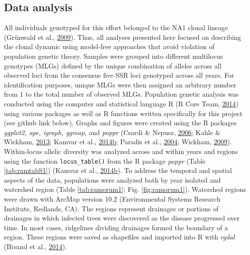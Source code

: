 \documentclass[double,11pt]{beavtex}
\begin{document}
  \subsection{Data analysis}\label{data-analysis-1}
  
  All individuals genotyped for this effort belonged to the NA1 clonal
  lineage (Grünwald et al.,
  \protect\hyperlink{ref-grunwald2009standardizing}{2009}). Thus, all
  analyses presented here focused on describing the clonal dynamic using
  model-free approaches that avoid violation of population genetic theory.
  Samples were grouped into different multilocus genotypes (MLGs) defined
  by the unique combination of alleles across all observed loci from the
  consensus five SSR loci genotyped across all years. For identification
  purposes, unique MLGs were then assigned an arbitrary number from 1 to
  the total number of observed MLGs. Population genetic analysis was
  conducted using the computer and statistical language R (R Core Team,
  \protect\hyperlink{ref-R2014}{2014}) using various packages as well as R
  functions written specifically for this project (see github link below).
  Graphs and figures were created using the R packages \emph{ggplot2, ape,
  igraph, ggmap,} and \emph{poppr} (Csardi \& Nepusz,
  \protect\hyperlink{ref-csardi2006igraph}{2006}; Kahle \& Wickham,
  \protect\hyperlink{ref-khale2013ggmap}{2013}; Kamvar et al.,
  \protect\hyperlink{ref-kamvar2014poppr}{2014}\protect\hyperlink{ref-kamvar2014poppr}{b};
  Paradis et al., \protect\hyperlink{ref-paradis2004ape}{2004}; Wickham,
  \protect\hyperlink{ref-wickham2009ggplot2}{2009}). Within-locus allelic
  diversity was analyzed across and within years and regions using the
  function \texttt{locus\_table()} from the R package \emph{poppr} (Table
  \ref{tab:ramtabS1}) (Kamvar et al.,
  \protect\hyperlink{ref-kamvar2014poppr}{2014}\protect\hyperlink{ref-kamvar2014poppr}{b}).
  To address the temporal and spatial aspects of the data, populations
  were analyzed both by year isolated and watershed region (Table
  \ref{tab:ramorum1}; Fig. \ref{fig:ramorum1}). Watershed regions were
  drawn with ArcMap version 10.2 (Environmental Systems Research
  Institute, Redlands, CA). The regions represent drainages or portions of
  drainages in which infected trees were discovered as the disease
  progressed over time. In most cases, ridgelines dividing drainages
  formed the boundary of a region. These regions were saved as shapefiles
  and imported into R with \emph{rgdal} (Bivand et al.,
  \protect\hyperlink{ref-bivand2014rgdal}{2014}).
  
\end{document}
